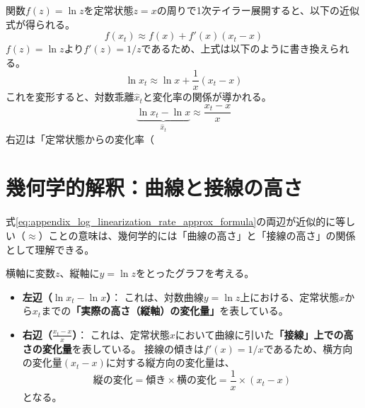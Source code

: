 関数\(f(z)=\ln z\)を定常状態\(z=x\)の周りで1次テイラー展開すると、以下の近似式が得られる。
\begin{equation}
    f(x_t)\approx f(x)+f'(x)(x_t-x)
    \label{eq:appendix_log_linearization_rate_taylor_base}
\end{equation}
\(f(z)=\ln z\)より\(f'(z)=1/z\)であるため、上式は以下のように書き換えられる。
\begin{equation}
    \ln x_t\approx\ln x+\frac{1}{x}(x_t-x)
    \label{eq:appendix_log_linearization_rate_taylor_log}
\end{equation}
これを変形すると、対数乖離\(\hat{x}_t\)と変化率の関係が導かれる。
\begin{equation}
    \underbrace{\ln x_t-\ln x}_{\hat{x}_t}\approx\frac{x_t-x}{x}
    \label{eq:appendix_log_linearization_rate_approx_formula}
\end{equation}
右辺は「定常状態からの変化率（%

\section{幾何学的解釈：曲線と接線の高さ}
\label{sec:appendix_log_linearization_geometry}

式\eqref{eq:appendix_log_linearization_rate_approx_formula}の両辺が近似的に等しい（\(\approx\)）ことの意味は、幾何学的には「曲線の高さ」と「接線の高さ」の関係として理解できる。

横軸に変数\(z\)、縦軸に\(y=\ln z\)をとったグラフを考える。

\begin{itemize}
    \item\label{itm:appendix_log_linearization_geometry_lhs} \textbf{左辺（\(\ln x_t-\ln x\)）}：
    これは、対数曲線\(y=\ln z\)上における、定常状態\(x\)から\(x_t\)までの\textbf{「実際の高さ（縦軸）の変化量」}を表している。
    
    \item\label{itm:appendix_log_linearization_geometry_rhs} \textbf{右辺（\(\frac{x_t-x}{x}\)）}：
    これは、定常状態\(x\)において曲線に引いた\textbf{「接線」上での高さの変化量}を表している。
    接線の傾きは\(f'(x)=1/x\)であるため、横方向の変化量\((x_t-x)\)に対する縦方向の変化量は、
    \begin{equation}
    \text{縦の変化}=\text{傾き}\times\text{横の変化}=\frac{1}{x}\times(x_t-x)
    \label{eq:appendix_log_linearization_geometry_delta}
    \end{equation}
    となる。
\end{itemize}

